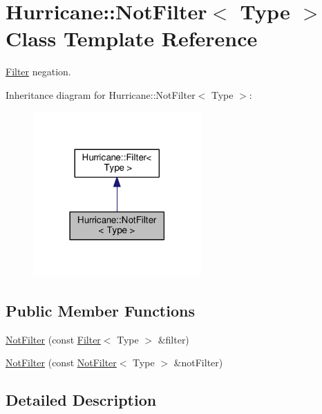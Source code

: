 \hypertarget{classHurricane_1_1NotFilter}{}\section{Hurricane\+:\+:Not\+Filter$<$ Type $>$ Class Template Reference}
\label{classHurricane_1_1NotFilter}


\mbox{\hyperlink{classHurricane_1_1Filter}{Filter}} negation.  




Inheritance diagram for Hurricane\+:\+:Not\+Filter$<$ Type $>$\+:\nopagebreak
\begin{figure}[H]
\begin{center}
\leavevmode
\includegraphics[width=182pt]{classHurricane_1_1NotFilter__inherit__graph}
\end{center}
\end{figure}
\subsection*{Public Member Functions}
\begin{DoxyCompactItemize}
\item 
\mbox{\hyperlink{classHurricane_1_1NotFilter_a8c75f2e192929c1b559f4ca876e47126}{Not\+Filter}} (const \mbox{\hyperlink{classHurricane_1_1Filter}{Filter}}$<$ Type $>$ \&filter)
\item 
\mbox{\hyperlink{classHurricane_1_1NotFilter_a232102dc584111a704e66b2ac793af86}{Not\+Filter}} (const \mbox{\hyperlink{classHurricane_1_1NotFilter}{Not\+Filter}}$<$ Type $>$ \&not\+Filter)
\end{DoxyCompactItemize}


\subsection{Detailed Description}
